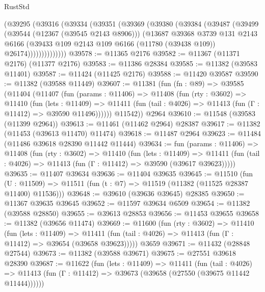 \begin{lexlean}{RustStd}
\begin{coremodule}
          (@39295
            (@39316
              (@39334
                (@39351
                  (@39369
                    (@39380
                      (@39384
                        (@39487
                          (@39499
                            (@39544 (@12367 (@39545 @2143 @8906)))
                            (@13687
                              @39368
                              @3739
                              @131
                              @2143
                              @6166
                              (@39433
                                @109
                                @2143
                                @109
                                @6166
                                (@11780 (@39438 @109))
                                @26174))))))))))))))
@39578 := @11365 @2176
@39582 := @11367 (@11371 @2176) (@11377 @2176)
@39583 := @11386 @28384
@39585 := @11382 (@39583 @11401)
@39587 := @11424 (@11425 @2176)
@39588 := @11420 @39587
@39590 := @11382 (@39588 @11449)
@39607 := @11381
    (fun (fn : @89) =>
    @39585
      (@11404
        (@11407
          (fun (params : @11406) =>
          @11408
            (fun (rty : @3602) =>
            @11410
              (fun (lets : @11409) =>
              @11411 (fun (tail : @4026) => @11413 (fun (Γ : @11412) => @39590 @11496))))))
        @11542))
    @2964
@39610 := @11548 (@39583 (@11399 @2964))
@39613 := @11461 (@11462 @2964) @28387
@39617 := @11382 (@11453 (@39613 @11470) @11474)
@39618 := @11487 @2964
@39623 := @11484 (@11486 @39618 @28390 @11442 @11444)
@39634 := fun (params : @11406) =>
  @11408
    (fun (rty : @3602) =>
    @11410
      (fun (lets : @11409) =>
      @11411 (fun (tail : @4026) => @11413 (fun (Γ : @11412) => @39590 (@39617 @39623)))))
@39635 := @11407 @39634
@39636 := @11404 @39635
@39645 := @11510
    (fun (U : @11509) => @11511 (fun (t : @7) => @11519 (@11382 (@11525 @28387 @11400) @11536)))
@39648 := @39610 (@39636 @39645) @28385
@39650 := @11367 @39635 @39645
@39652 := @11597 @39634 @6509
@39654 := @11382 (@39588 @28850)
@39655 := @39613 @28853
@39656 := @11453 @39655
@39658 := @11382 (@39656 @11474)
@39669 := @11600
    (fun (rty : @3602) =>
    @11410
      (fun (lets : @11409) =>
      @11411 (fun (tail : @4026) => @11413 (fun (Γ : @11412) => @39654 (@39658 @39623)))))
    @3659
@39671 := @11432 (@28848 @27544)
@39673 := @11382 (@39588 @39671)
@39675 := @27551 @39618 @28390
@39687 := @11622
    (fun (lets : @11409) =>
    @11411
      (fun (tail : @4026) =>
      @11413 (fun (Γ : @11412) => @39673 (@39658 (@27550 (@39675 @11442 @11444))))))

\end{coremodule}
\end{lexlean}
